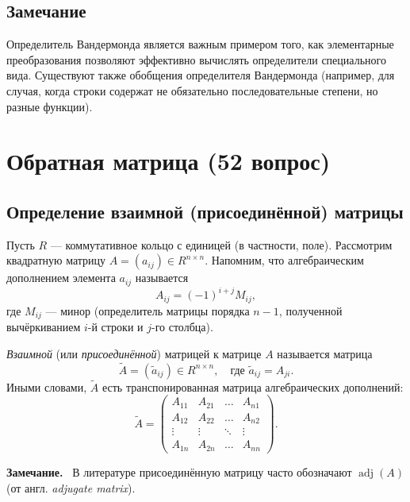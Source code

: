 \documentclass[a4paper,12pt]{article}
\newcommand{\myremark}{\textbf{Замечание.}\ }
\theoremstyle{definition}
\theoremstyle{plain}
\theoremstyle{remark}
\begin{document}
	\subsection{Замечание}
	
	Определитель Вандермонда является важным примером того, как элементарные преобразования позволяют эффективно вычислять определители специального вида. Существуют также обобщения определителя Вандермонда (например, для случая, когда строки содержат не обязательно последовательные степени, но разные функции).
	
	
	
	
	\newpage
	\section{Обратная матрица (52 вопрос)}
	
	\subsection{Определение взаимной (присоединённой) матрицы}
	
	Пусть \( R \) — коммутативное кольцо с единицей (в частности, поле). Рассмотрим квадратную матрицу \( A = (a_{ij}) \in R^{n \times n} \). Напомним, что алгебраическим дополнением элемента \( a_{ij} \) называется
	\[
	A_{ij} = (-1)^{i+j} M_{ij},
	\]
	где \( M_{ij} \) — минор (определитель матрицы порядка \( n-1 \), полученной вычёркиванием \( i \)-й строки и \( j \)-го столбца).
	
	\begin{tcolorbox}[colback=blue!5, colframe=blue!40!black, title=Определение]
		\textit{Взаимной} (или \textit{присоединённой}) матрицей к матрице \( A \) называется матрица
		\[
		\tilde{A} = (\tilde{a}_{ij}) \in R^{n \times n}, \quad \text{где } \tilde{a}_{ij} = A_{ji}.
		\]
		Иными словами, \( \tilde{A} \) есть транспонированная матрица алгебраических дополнений:
		\[
		\tilde{A} = 
		\begin{pmatrix}
			A_{11} & A_{21} & \dots & A_{n1} \\
			A_{12} & A_{22} & \dots & A_{n2} \\
			\vdots & \vdots & \ddots & \vdots \\
			A_{1n} & A_{2n} & \dots & A_{nn}
		\end{pmatrix}.
		\]
	\end{tcolorbox}
	
	\myremark
	В литературе присоединённую матрицу часто обозначают \( \operatorname{adj}(A) \) (от англ. \textit{adjugate matrix}).
	
\end{document}
